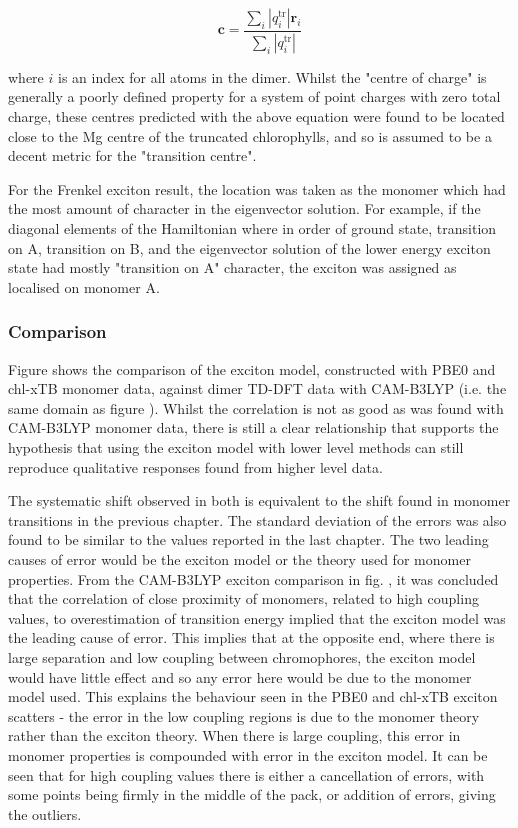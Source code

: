 \begin{equation}
    \mathbf{c} = \frac{\sum_i \left\lvert q^{\text{tr}}_i \right\rvert \mathbf{r}_i}{\sum_i \left\lvert q^{\text{tr}}_i \right\rvert}
\end{equation}

where $i$ is an index for all atoms in the dimer. Whilst the "centre of charge"
is generally a poorly defined property for a system of point charges with zero total
charge, these centres predicted with the above equation were found to be located close
to the Mg centre of the truncated chlorophylls, and so is assumed to be a decent
metric for the "transition centre".

For the Frenkel exciton result, the location was taken as the monomer which had 
the most amount of character in the eigenvector solution. For example, if the diagonal
elements of the Hamiltonian where in order of ground state, transition on A, transition
on B, and the eigenvector solution of the lower energy exciton state had mostly
"transition on A" character, the exciton was assigned as localised on monomer A.

\subsubsection{Comparison}
\label{subsec:state_assign}

Figure shows the comparison of the exciton model, constructed with PBE0 and chl-xTB
monomer data, against dimer TD-DFT data with CAM-B3LYP (i.e. the same domain as 
figure ). Whilst the correlation is not as good as was found with CAM-B3LYP monomer
data, there is still a clear relationship that supports the hypothesis that using
the exciton model with lower level methods can still reproduce qualitative responses
found from higher level data.

The systematic shift observed in both is equivalent to the shift found in monomer
transitions in the previous chapter. The standard deviation of the errors was also
found to be similar to the values reported in the last chapter. 
The two leading causes of error would be the exciton model or the theory used for
monomer properties. From the CAM-B3LYP exciton comparison in fig. , it was concluded
that the correlation of close proximity of monomers, related to high coupling values,
to overestimation of transition energy implied that the exciton model was the leading
cause of error. This implies that at the opposite end, where there is large separation
and low coupling between chromophores, the exciton model would have little effect
and so any error here would be due to the monomer model used. This explains the 
behaviour seen in the PBE0 and chl-xTB exciton scatters - the error in the low coupling
regions is due to the monomer theory rather than the exciton theory. When there is 
large coupling, this error in monomer properties is compounded with error in the
exciton model. It can be seen that for high coupling values there is either a cancellation
of errors, with some points being firmly in the middle of the pack, or addition 
of errors, giving the outliers.


